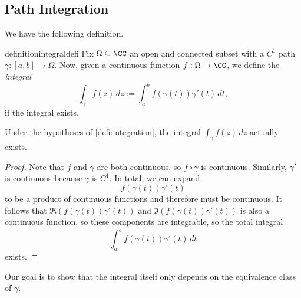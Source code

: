 \subsection{Path Integration}
We have the following definition.
\begin{restatable}[Integration]{definition}{integraldefi} \label{defi:integration}
	Fix $\Omega\subseteq\CC$ an open and connected subset with a $C^1$ path $\gamma:[a,b]\to\Omega$. Now, given a continuous function $f:\Omega\to\CC$, we define the \textit{integral}
	\[\int_\gamma f(z)\,dz:=\int_a^bf(\gamma(t))\gamma'(t)\,dt,\]
	if the integral exists.
\end{restatable}
\begin{lemma}
	Under the hypotheses of \autoref{defi:integration}, the integral $\int_\gamma f(z)\,dz$ actually exists.
\end{lemma}
\begin{proof}
	Note that $f$ and $\gamma$ are both continuous, so $f\circ\gamma$ is continuous. Similarly, $\gamma'$ is continuous because $\gamma$ is $C^1$. In total, we can expand
	\[f(\gamma(t))\gamma'(t)\]
	to be a product of continuous functions and therefore must be continuous. It follows that $\Re(f(\gamma(t))\gamma'(t))$ and $\Im(f(\gamma(t))\gamma'(t))$ is also a continuous function, so these components are integrable, so the total integral
	\[\int_a^bf(\gamma(t))\gamma'(t)\,dt\]
	exists.
\end{proof}
Our goal is to show that the integral itself only depends on the equivalence class of $\gamma$.

